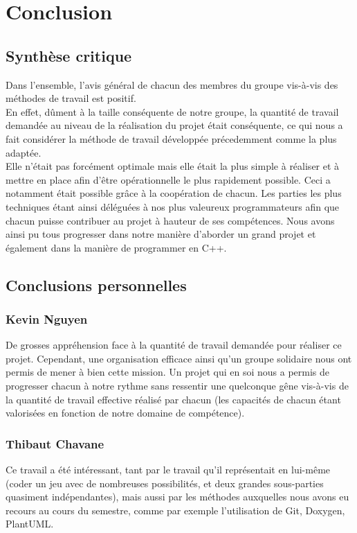 \chapter{Conclusion}
    \section{Synthèse critique}
        Dans l'ensemble, l'avis général de chacun des membres du groupe vis-à-vis des méthodes de travail est positif.\\

        En effet, dûment à la taille conséquente de notre groupe, la quantité de travail demandée au niveau de la réalisation du projet était conséquente, ce qui nous a fait considérer la méthode de travail développée précedemment comme la plus adaptée.\\

        Elle n'était pas forcément optimale mais elle était la plus simple à réaliser et à mettre en place afin d'être opérationnelle le plus rapidement possible. Ceci a notamment était possible grâce à la coopération de chacun. Les parties les plus techniques étant ainsi déléguées à nos plus valeureux programmateurs afin que chacun puisse contribuer au projet à hauteur de ses compétences. Nous avons ainsi pu tous progresser dans notre manière d'aborder un grand projet et également dans la manière de programmer en C++.
    \section{Conclusions personnelles}
        \subsection{Kevin Nguyen}
            De grosses appréhension face à la quantité de travail demandée pour réaliser ce projet. Cependant, une organisation efficace ainsi qu'un groupe solidaire nous ont permis de mener à bien cette mission. Un projet qui en soi nous a permis de progresser chacun à notre rythme sans ressentir une quelconque gêne vis-à-vis de la quantité de travail effective réalisé par chacun (les capacités de chacun étant valorisées en fonction de notre domaine de compétence).
        \subsection{Thibaut Chavane}
            Ce travail a été intéressant, tant par le travail qu'il représentait en lui-même (coder un jeu avec de nombreuses possibilités, et deux grandes sous-parties quasiment indépendantes), mais aussi par les méthodes auxquelles nous avons eu recours au cours du semestre, comme par exemple l'utilisation de Git, Doxygen, PlantUML. \\

